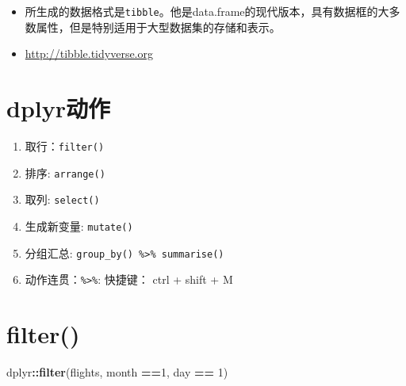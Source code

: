 \documentclass[
]{article}
\newenvironment{Shaded}{\begin{snugshade}}{\end{snugshade}}
\newcommand{\DecValTok}[1]{\textcolor[rgb]{0.00,0.00,0.81}{#1}}
\newcommand{\KeywordTok}[1]{\textcolor[rgb]{0.13,0.29,0.53}{\textbf{#1}}}
\newcommand{\NormalTok}[1]{#1}
\newcommand{\OperatorTok}[1]{\textcolor[rgb]{0.81,0.36,0.00}{\textbf{#1}}}
\newcommand{\StringTok}[1]{\textcolor[rgb]{0.31,0.60,0.02}{#1}}
\providecommand{\tightlist}{%
  \setlength{\itemsep}{0pt}\setlength{\parskip}{0pt}}
\begin{document}
\begin{itemize}
\item
  所生成的数据格式是\texttt{tibble}。他是data.frame的现代版本，具有数据框的大多数属性，但是特别适用于大型数据集的存储和表示。
\item
  \url{http://tibble.tidyverse.org}
\end{itemize}

\hypertarget{dplyrux52a8ux4f5c}{%
\section{dplyr动作}\label{dplyrux52a8ux4f5c}}

\begin{enumerate}
\def\labelenumi{\arabic{enumi}.}
\tightlist
\item
  取行：\texttt{filter()}
\item
  排序: \texttt{arrange()}
\item
  取列: \texttt{select()}
\item
  生成新变量: \texttt{mutate()}
\item
  分组汇总: \texttt{group\_by()\ \%\textgreater{}\%\ summarise()}
\item
  动作连贯：\texttt{\%\textgreater{}\%}: 快捷键： ctrl + shift + M
\end{enumerate}

\hypertarget{filter}{%
\section{filter()}\label{filter}}

\begin{Shaded}
\begin{Highlighting}[]
\NormalTok{dplyr}\OperatorTok{::}\KeywordTok{filter}\NormalTok{(flights, month }\OperatorTok{==}\DecValTok{1}\NormalTok{, day }\OperatorTok{==}\StringTok{ }\DecValTok{1}\NormalTok{)}
\end{Highlighting}
\end{Shaded}
\end{document}
